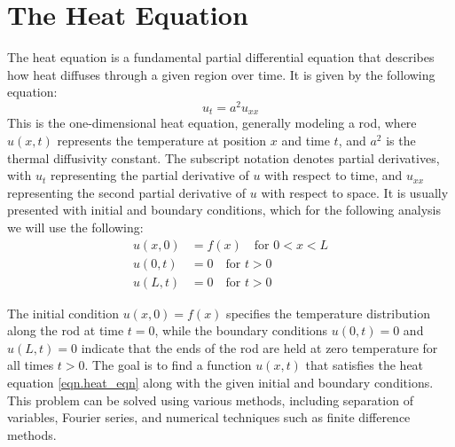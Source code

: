 \section{The Heat Equation} \label{sec.heat_equation}
The heat equation is a fundamental partial differential equation that describes how heat diffuses through a given region over time. It is given by the following equation:
\begin{equation}\label{eqn.heat_eqn}
    u_t = a^2 u_{xx}
\end{equation}
This is the one-dimensional heat equation, generally modeling a rod,  where $u(x,t)$ represents the temperature at position $x$ and time $t$, and $a^2$ is the thermal diffusivity constant. The subscript notation denotes partial derivatives, with $u_t$ representing the partial derivative of $u$ with respect to time, and $u_{xx}$ representing the second partial derivative of $u$ with respect to space.
It is usually presented with initial and boundary conditions, which for the following analysis we will use the following:
\begin{align*} \label{ic.heat_eqn}
    u(x,0) &= f(x) \quad \text{for } 0 < x < L \\
    u(0,t) &= 0 \quad \text{for } t > 0 \\
    u(L,t) &= 0 \quad \text{for } t > 0
\end{align*}

The initial condition $u(x,0) = f(x)$ specifies the temperature distribution along the rod at time $t=0$, while the boundary conditions $u(0,t) = 0$ and $u(L,t) = 0$ indicate that the ends of the rod are held at zero temperature for all times $t > 0$. The goal is to find a function $u(x,t)$ that satisfies the heat equation \eqref{eqn.heat_eqn} along with the given initial and boundary conditions. This problem can be solved using various methods, including separation of variables, Fourier series, and numerical techniques such as finite difference methods.

